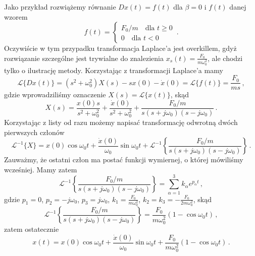 \documentclass[../main.tex]{subfiles}
\begin{document}
Jako przykład rozwiążemy równanie \(Dx(t)=f(t)\) dla \(\beta=0\) i \(f(t)\) danej wzorem
\begin{equation*}
    f(t)=\begin{cases}F_0/m\quad\text{dla \(t\geq0\)}\\ 0\quad\text{dla \(t<0\)}\end{cases}\,.
\end{equation*}
Oczywiście w tym przypadku transformacja Laplace'a jest overkillem, gdyż rozwiązanie szczególne jest trywialne do znalezienia \(x_s(t)=\frac{F_0}{m\omega_0^2}\), ale chodzi tylko o ilustrację metody. Korzystając z transformacji Laplace'a mamy
\begin{equation*}
    \mathscr{L}\{Dx(t)\}=(s^2+\omega_0^2)X(s)-sx(0)-\dot x(0)=\mathscr{L}\{f(t)\}=\frac{F_0}{ms}\,,
\end{equation*}
gdzie wprowadziliśmy oznaczenie \(X(s)=\mathscr{L}\{x(t)\}\), skąd
\begin{equation*}
    X(s)=\frac{x(0)s}{s^2+\omega_0^2}+\frac{\dot x(0)}{s^2+\omega_0^2}+\frac{F_0/m}{s(s+j\omega_0)(s-j\omega_0)}\,.
\end{equation*}
Korzystając z listy od razu możemy napisać transformację odwrotną dwóch pierwszych członów
\begin{equation*}
    \mathscr{L}^{-1}\{X\}=x(0)\cos\omega_0t+\frac{\dot x(0)}{\omega_0}\sin\omega_0t+\mathscr{L}^{-1}\left\{\frac{F_0/m}{s(s+j\omega_0)(s-j\omega_0)}\right\}\,.
    \end{equation*}
    Zauważmy, że ostatni człon ma postać funkcji wymiernej, o której mówiliśmy wcześniej. Mamy zatem
    \begin{equation*}
        \mathscr{L}^{-1}\left\{\frac{F_0/m}{s(s+j\omega_0)(s-j\omega_0)}\right\}=\sum_{\alpha=1}^3k_\alpha e^{p_\alpha t}\,,
    \end{equation*}
    gdzie \(p_1=0\), \(p_2=-j\omega_0\), \(p_3=j\omega_0\), \(k_1=\frac{F_0}{m\omega_0^2}\), \(k_2=k_3=-\frac{F_0}{2m\omega_0^2}\), skąd
    \begin{equation*}
        \mathscr{L}^{-1}\left\{\frac{F_0/m}{s(s+j\omega_0)(s-j\omega_0)}\right\}=\frac{F_0}{m\omega_0^2}\left(1-\cos\omega_0t\right)\,,
    \end{equation*}
    zatem ostatecznie
    \begin{equation*}
        x(t)=x(0)\cos\omega_0t+\frac{\dot x(0)}{\omega_0}\sin\omega_0t+\frac{F_0}{m\omega_0^2}\left(1-\cos\omega_0t\right)\,.
    \end{equation*}
    
\end{document}
